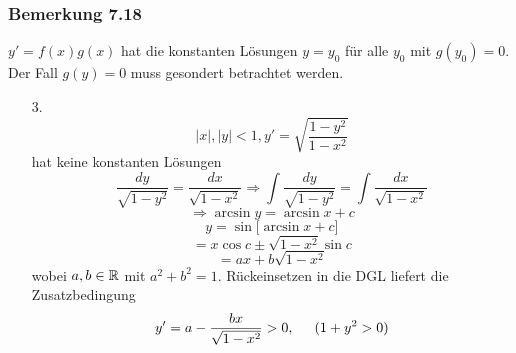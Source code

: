 \subsubsection*{Bemerkung 7.18}
$y'=f(x)g(x)$ hat die konstanten Lösungen $y=y_0$ für alle $y_0$ mit $g(y_0)=0$. Der Fall $g(y)=0$ muss gesondert betrachtet werden.
\begin{enumerate}
\item[3.] \[\left| x\right|, \left| y\right|<1,y'=\sqrt{\frac{1-y^2}{1-x^2}}\]
hat keine konstanten Lösungen
\[\frac{{dy}}{{\sqrt {1 - {y^2}} }} = \frac{{dx}}{{\sqrt {1 - {x^2}} }} \Rightarrow \int {\frac{{dy}}{{\sqrt {1 - {y^2}} }}}  = \int {\frac{{dx}}{{\sqrt {1 - {x^2}} }}} \]
\[\Rightarrow \arcsin y=\arcsin x+c\]
\[y=\sin\lbrack\arcsin x+c \rbrack\]
\[=x\cos c\pm\sqrt{1-x^2}\sin c\]
\[=ax+b\sqrt{1-x^2}\]
wobei $a,b\in\mathbb{R}$ mit $a^2+b^2=1$. Rückeinsetzen in die DGL liefert die Zusatzbedingung \[y'=a-\frac{bx}{\sqrt{1-x^2}}>0,\hspace{5mm} (1+y^2>0)\]
\end{enumerate}
